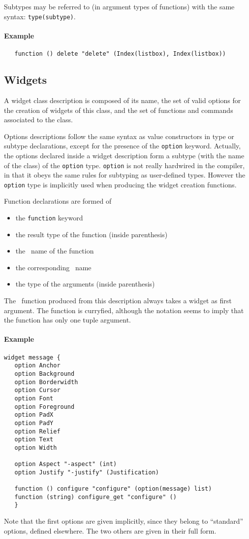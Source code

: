 Subtypes may be referred to (in argument types of functions) with the same
syntax: \verb|type(subtype)|.
\paragraph{Example}
\begin{verbatim}
   function () delete "delete" (Index(listbox), Index(listbox))
\end{verbatim} 

\subsection{Widgets}
A widget class description is composed of its name, the set of valid options
for the creation of widgets of this class, and the set of functions and
commands associated to the class.

Options descriptions follow the same syntax as value constructors in type or
subtype declarations, except for the presence of the \verb|option| keyword.
Actually, the options declared inside a widget description form a subtype
(with the name of the class) of the \verb|option| type. 
\verb|option| is not really hardwired in the compiler, in that it obeys the
same rules for subtyping as user-defined types. However the \verb|option|
type is implicitly used when producing the widget creation functions.

Function declarations are formed of
\begin{itemize}
\item the \verb|function| keyword
\item the result type of the function (inside parenthesis)
\item the \caml\ name of the function
\item the corresponding \tk\ name
\item the type of the arguments (inside parenthesis)
\end{itemize} 

The \caml\ function produced from this description always takes a widget as
first argument. The function is curryfied, although the notation seems to
imply that the function has only one tuple argument.


\paragraph{Example}
\begin{verbatim}
widget message {
   option Anchor
   option Background
   option Borderwidth
   option Cursor
   option Font
   option Foreground
   option PadX
   option PadY
   option Relief
   option Text
   option Width

   option Aspect "-aspect" (int)
   option Justify "-justify" (Justification)

   function () configure "configure" (option(message) list)
   function (string) configure_get "configure" ()
   }
\end{verbatim}
Note that the first options are given implicitly, since they belong to
``standard'' options, defined elsewhere. The two others are given in their
full form. 

